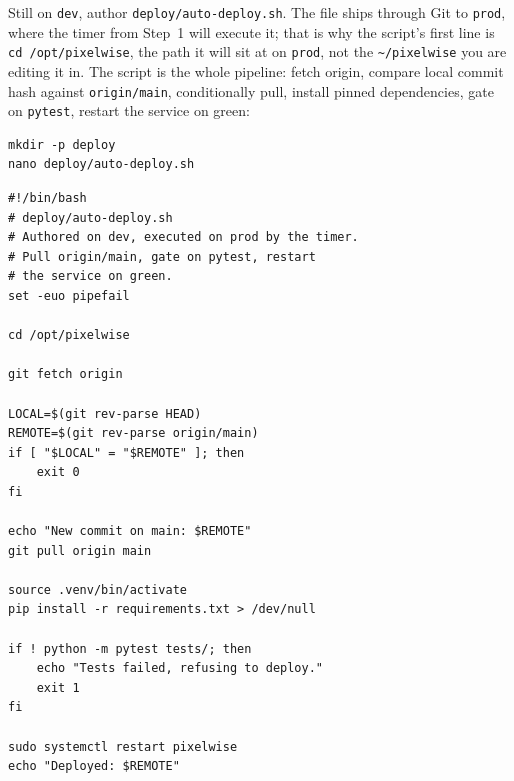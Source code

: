 \newpage
{}
Still on \texttt{dev}, author \texttt{deploy/auto-deploy.sh}.
The file ships through Git to \texttt{prod}, where the timer from
Step~1 will execute it; that is why the script's first line is
\texttt{cd /opt/pixelwise}, the path it will sit at on \texttt{prod},
not the \texttt{\textasciitilde/pixelwise} you are editing it in.
The script is the whole pipeline: fetch origin, compare local commit hash
against \texttt{origin/main}, conditionally pull, install pinned
dependencies, gate on \texttt{pytest}, restart the service on green:

\begin{verbatim}
mkdir -p deploy
nano deploy/auto-deploy.sh
\end{verbatim}




\begin{verbatim}
#!/bin/bash
# deploy/auto-deploy.sh
# Authored on dev, executed on prod by the timer.
# Pull origin/main, gate on pytest, restart
# the service on green.
set -euo pipefail

cd /opt/pixelwise

git fetch origin

LOCAL=$(git rev-parse HEAD)
REMOTE=$(git rev-parse origin/main)
if [ "$LOCAL" = "$REMOTE" ]; then
    exit 0
fi

echo "New commit on main: $REMOTE"
git pull origin main

source .venv/bin/activate
pip install -r requirements.txt > /dev/null

if ! python -m pytest tests/; then
    echo "Tests failed, refusing to deploy."
    exit 1
fi

sudo systemctl restart pixelwise
echo "Deployed: $REMOTE"
\end{verbatim}





